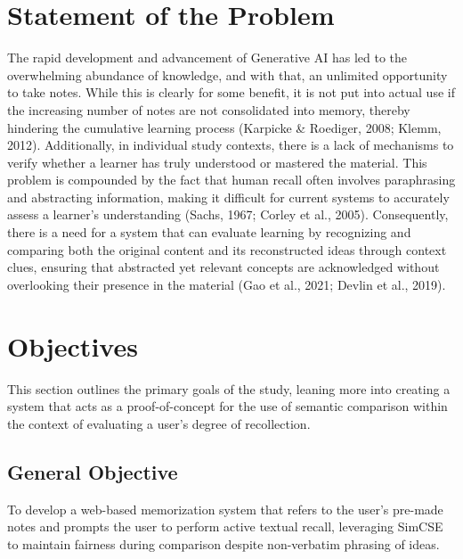 \section{Statement of the Problem}

The rapid development and advancement of Generative AI has led to the overwhelming abundance of knowledge, and with that, an unlimited opportunity to take notes. While this is clearly for some benefit, it is not put into actual use if the increasing number of notes are not consolidated into memory, thereby hindering the cumulative learning process (Karpicke \& Roediger, 2008; Klemm, 2012). Additionally, in individual study contexts, there is a lack of mechanisms to verify whether a learner has truly understood or mastered the material. This problem is compounded by the fact that human recall often involves paraphrasing and abstracting information, making it difficult for current systems to accurately assess a learner’s understanding (Sachs, 1967; Corley et al., 2005). Consequently, there is a need for a system that can evaluate learning by recognizing and comparing both the original content and its reconstructed ideas through context clues, ensuring that abstracted yet relevant concepts are acknowledged without overlooking their presence in the material (Gao et al., 2021; Devlin et al., 2019).



\section{Objectives}
This section outlines the primary goals of the study, leaning more into creating a system that acts as a proof-of-concept for the use of semantic comparison within the context of evaluating a user's degree of recollection.

\subsection{General Objective}
To develop a web-based memorization system that refers to the user’s pre-made notes and prompts the user to perform active textual recall, leveraging SimCSE to maintain fairness during comparison despite non-verbatim phrasing of ideas.

